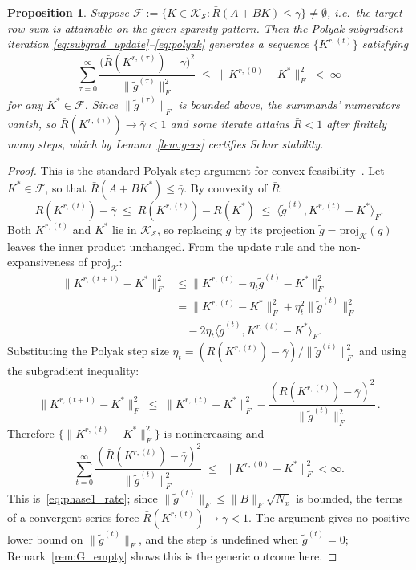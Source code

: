 \documentclass[letterpaper, 10pt, conference]{ieeeconf}
\newtheorem{proposition}{Proposition}
\begin{document}
\begin{proposition} \label{prop:phase1_conv}
Suppose $\mathcal{F} := \{K\in\mathcal{K}_{\mathcal{S}} :
\bar{R}(A+BK)\le\bar{\gamma}\}\neq\emptyset$, i.e.\ the target row-sum is
attainable on the given sparsity pattern. Then the Polyak subgradient iteration
\eqref{eq:subgrad_update}--\eqref{eq:polyak} generates a sequence
$\{K^{r,(t)}\}$ satisfying
\begin{equation}\label{eq:phase1_rate}
  \sum_{\tau=0}^{\infty}
  \frac{\bigl(\bar{R}(K^{r,(\tau)}) - \bar{\gamma}\bigr)^2}
       {\|\tilde{g}^{(\tau)}\|_F^2}
  \;\le\; \|K^{r,(0)}-K^*\|_F^2 \;<\; \infty
\end{equation}
for any $K^*\in\mathcal{F}$. Since $\|\tilde{g}^{(\tau)}\|_F$ is bounded above,
the summands' numerators vanish, so $\bar{R}(K^{r,(\tau)})\to\bar{\gamma}<1$ and
some iterate attains $\bar{R}<1$ after finitely many steps, which by
Lemma~\ref{lem:gers} certifies Schur stability.
\end{proposition}

\begin{proof}
This is the standard Polyak-step argument for convex
feasibility~\cite{polyak1987introduction}.  Let $K^*\in\mathcal{F}$, so that
$\bar{R}(A+BK^*)\le\bar{\gamma}$.  By convexity of $\bar{R}$:
\[
  \bar{R}(K^{r,(t)})-\bar{\gamma}
  \;\le\;
  \bar{R}(K^{r,(t)})-\bar{R}(K^*)
  \;\le\;
  \bigl\langle \tilde{g}^{(t)}, K^{r,(t)}\!-\!K^* \bigr\rangle_F .
\]
Both $K^{r,(t)}$ and $K^*$ lie in $\mathcal{K}_{\mathcal{S}}$, so replacing $g$
by its projection $\tilde{g}=\mathrm{proj}_{\mathcal{K}}(g)$ leaves the inner
product unchanged. From the update rule and the non-expansiveness of
$\mathrm{proj}_{\mathcal{K}}$:
\begin{align*}
\|K^{r,(t+1)}-K^*\|_F^2
&\le \|K^{r,(t)}-\eta_t\tilde{g}^{(t)}-K^*\|_F^2 \\
&= \|K^{r,(t)}\!-\!K^*\|_F^2
   + \eta_t^2\|\tilde{g}^{(t)}\|_F^2 \\
&\quad - 2\eta_t\big\langle\tilde{g}^{(t)},K^{r,(t)}\!-\!K^*\big\rangle_F .
\end{align*}
Substituting the Polyak step size $\eta_t =
(\bar{R}(K^{r,(t)})-\bar{\gamma})/\|\tilde{g}^{(t)}\|_F^2$ and using
the subgradient inequality:
\[
  \|K^{r,(t+1)}-K^*\|_F^2
  \;\le\;
  \|K^{r,(t)}-K^*\|_F^2
  - \frac{(\bar{R}(K^{r,(t)})-\bar{\gamma})^2}{\|\tilde{g}^{(t)}\|_F^2}\,.
\]
Therefore $\{\|K^{r,(t)}-K^*\|_F^2\}$ is nonincreasing and
\[
  \sum_{t=0}^{\infty}
  \frac{(\bar{R}(K^{r,(t)})-\bar{\gamma})^2}{\|\tilde{g}^{(t)}\|_F^2}
  \;\le\; \|K^{r,(0)}-K^*\|_F^2 < \infty.
\]
This is~\eqref{eq:phase1_rate}; since $\|\tilde{g}^{(t)}\|_F\le\|B\|_F\sqrt{N_x}$
is bounded, the terms of a convergent series force
$\bar{R}(K^{r,(t)})\to\bar{\gamma}<1$. The argument gives no positive lower
bound on $\|\tilde{g}^{(t)}\|_F$, and the step is undefined when
$\tilde{g}^{(t)}=0$; Remark~\ref{rem:G_empty} shows this is the generic outcome
here.
\end{proof}
\end{document}
